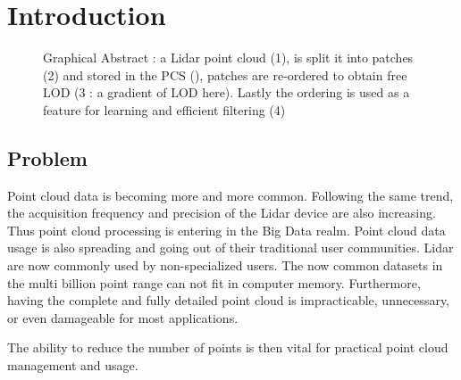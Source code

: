 

\section{Introduction}

\begin{figure}[t!]
	\begin{center}
		\caption{Graphical Abstract : a Lidar point cloud (1), is split it into patches (2) 
		and stored in the PCS (\cite{Cura2015}), patches are re-ordered to obtain free LOD 
		(3 : a gradient of LOD here).
		Lastly the ordering is used as a feature for learning and efficient filtering (4) } 
		\label{lod.fig:banner_image}
	\end{center}
\end{figure} 

	\subsection{Problem}  
		Point cloud data is becoming more and more common. Following the same trend, the acquisition frequency and precision of the Lidar device are also increasing.
		Thus point cloud processing is entering in the Big Data realm.
		Point cloud data usage is also spreading and going out of their traditional user communities. 
		Lidar are now commonly used by non-specialized users. 
		The now common datasets in the multi billion point range can not fit in computer memory. 
		Furthermore, having the complete and fully detailed point cloud is impracticable, unnecessary, or even damageable for most applications.
		
		The ability to reduce the number of points is then vital for practical point cloud management and usage.
		 
